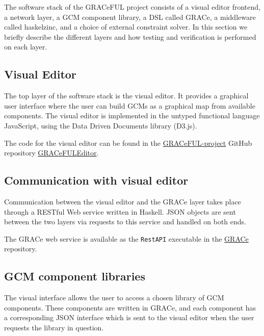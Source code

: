 The software stack of the GRACeFUL project consists of
%
a visual editor frontend,
%
a network layer,
%
a GCM component library,
%
a DSL called GRACe,
%
a middleware called haskelzinc, and
%
a choice of external constraint solver.
%
In this section we briefly describe the different layers and how testing and
verification is performed on each layer.

\subsection*{Visual Editor}

The top layer of the software stack is the visual editor.
%
It provides a graphical user interface where the user can build GCMs
as a graphical map from available components.
%
The visual editor is implemented in the untyped functional language
JavaScript, using the Data Driven Documents library (D3.js).
%

The code for the visual editor can be found in the 
\href{https://github.com/GRACeFUL-project}{GRACeFUL-project} GitHub
repository
\href{https://github.com/GRACeFUL-project/GRACeFULEditor}{GRACeFULEditor}.


\subsection*{Communication with visual editor}

Communication between the visual editor and the GRACe layer takes
place through a RESTful Web service written in Haskell.
%
JSON objects are sent between the two layers via requests to this
service and handled on both ends.

The GRACe web service is available as the \texttt{RestAPI} executable in the
\href{https://github.com/GRACeFUL-project/GRACe}{GRACe} repository.

\subsection*{GCM component libraries}

The visual interface allows the user to access a chosen library of GCM
components.
%
These components are written in GRACe, and each component has a
corresponding JSON interface which is sent to the visual editor when
the user requests the library in question.

